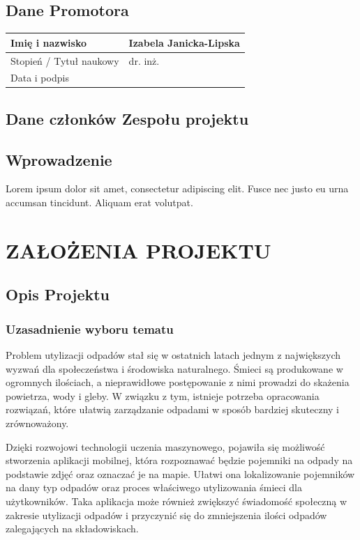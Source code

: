 \documentclass[12pt, a4paper, twoside, openany]{book}
\begin{document}
\section{Dane Promotora}

\begin{tabular}{ |p{5cm}|p{7cm}|}
    \hline
    Imię i nazwisko         & Izabela Janicka-Lipska \\
    \hline
    Stopień / Tytuł naukowy & dr. inż.               \\
    \hline
    Data i podpis           &                        \\ \hline
\end{tabular}

\section{Dane członków Zespołu projektu}

\membersTable


\section{Wprowadzenie}
Lorem ipsum dolor sit amet, consectetur adipiscing elit. Fusce nec justo eu urna accumsan tincidunt. Aliquam erat volutpat.

\chapter{\MakeUppercase{Założenia projektu}}

\section{Opis Projektu}

\subsection{Uzasadnienie wyboru tematu}

Problem utylizacji odpadów stał się w ostatnich latach jednym z największych wyzwań dla społeczeństwa i środowiska naturalnego. Śmieci są produkowane w ogromnych ilościach, a nieprawidłowe postępowanie z nimi prowadzi do skażenia powietrza, wody i gleby. W związku z tym, istnieje potrzeba opracowania rozwiązań, które ułatwią zarządzanie odpadami w sposób bardziej skuteczny i zrównoważony.

Dzięki rozwojowi technologii uczenia maszynowego, pojawiła się możliwość stworzenia aplikacji mobilnej, która rozpoznawać będzie pojemniki na odpady na podstawie zdjęć oraz oznaczać je na mapie. Ułatwi ona lokalizowanie pojemników na dany typ odpadów oraz proces właściwego utylizowania śmieci dla użytkowników. Taka aplikacja może również zwiększyć świadomość społeczną w zakresie utylizacji odpadów i przyczynić się do zmniejszenia ilości odpadów zalegających na składowiskach.
\end{document}
